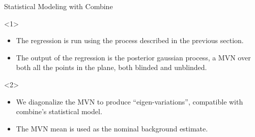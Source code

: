 \documentclass[10pt]{beamer}
\begin{document}

\begin{frame}[fragile, label=current]{Statistical Modeling with Combine}
  \begin{center}
  \end{center} 
  \begin{overlayarea}{\textwidth}{0.8\textwidth}
    \begin{center}
      \begin{onlyenv}<1>
        \begin{itemize}
        \item The regression is run using the process described in the previous section.
        \item The output of the regression is the posterior gaussian process, a MVN over both all the points in the plane, both blinded and unblinded.
        \end{itemize}
      \end{onlyenv}
      \begin{onlyenv}<2>
        \begin{itemize}
        \item We diagonalize the MVN to produce ``eigen-variations'', compatible with combine's statistical model.
        \item The MVN mean is used as the nominal background estimate.


\end{itemize}
\end{onlyenv}
\end{center}
\end{overlayarea}
\end{frame}
\end{document}
